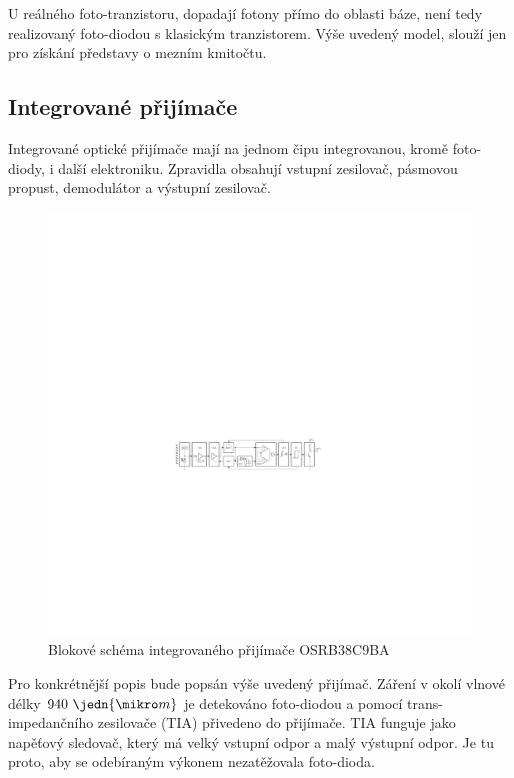 U reálného foto-tranzistoru, dopadají fotony přímo do oblasti báze, není tedy realizovaný foto-diodou s klasickým tranzistorem. Výše uvedený model, slouží jen pro získání představy o mezním kmitočtu.

\subsection{Integrované přijímače}
Integrované optické přijímače mají na jednom čipu integrovanou, kromě foto-diody, i další elektroniku. Zpravidla obsahují vstupní zesilovač, pásmovou propust, demodulátor a výstupní zesilovač.

\begin{figure}[H]
    \begin{center}
        \includegraphics[width=\textwidth]{img/ir-rx}
    \end{center}
    \caption{Blokové schéma integrovaného přijímače OSRB38C9BA}
\end{figure}

Pro konkrétnější popis bude popsán výše uvedený přijímač. Záření v okolí vlnové délky $940~\jedn{\mikro m}$ je detekováno foto-diodou a pomocí trans-impedančního zesilovače (TIA) přivedeno do přijímače. TIA funguje jako napěťový sledovač, který má velký vstupní odpor a malý výstupní odpor. Je tu proto, aby se odebíraným výkonem nezatěžovala foto-dioda.

